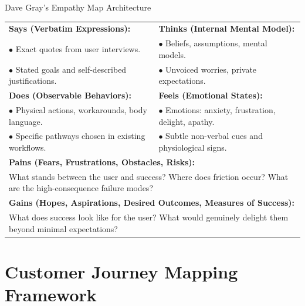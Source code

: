 \begin{canvasbox}{Dave Gray's Empathy Map Architecture}
\begin{tabularx}{\linewidth}{|X|X|} \hline
\textbf{Says (Verbatim Expressions):} & \textbf{Thinks (Internal Mental Model):} \\
$\bullet$ Exact quotes from user interviews. & $\bullet$ Beliefs, assumptions, mental models. \\
$\bullet$ Stated goals and self-described justifications. & $\bullet$ Unvoiced worries, private expectations. \\ \hline
\textbf{Does (Observable Behaviors):} & \textbf{Feels (Emotional States):} \\
$\bullet$ Physical actions, workarounds, body language. & $\bullet$ Emotions: anxiety, frustration, delight, apathy. \\
$\bullet$ Specific pathways chosen in existing workflows. & $\bullet$ Subtle non-verbal cues and physiological signs. \\ \hline
\multicolumn{2}{|l|}{\textbf{Pains (Fears, Frustrations, Obstacles, Risks):}} \\
\multicolumn{2}{|X|}{What stands between the user and success? Where does friction occur? What are the high-consequence failure modes?} \\ \hline
\multicolumn{2}{|l|}{\textbf{Gains (Hopes, Aspirations, Desired Outcomes, Measures of Success):}} \\
\multicolumn{2}{|X|}{What does success look like for the user? What would genuinely delight them beyond minimal expectations?} \\ \hline
\end{tabularx}
\end{canvasbox}

\section{Customer Journey Mapping Framework}

